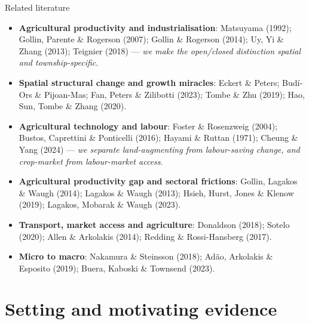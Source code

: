 \documentclass[10pt,aspectratio=169]{beamer}
\begin{document}
\begin{frame}{Related literature}
  \footnotesize
  \begin{itemize}
    \item \textbf{Agricultural productivity and industrialisation}: Matsuyama (1992);
          Gollin, Parente \& Rogerson (2007); Gollin \& Rogerson (2014); Uy, Yi \& Zhang
          (2013); Teignier (2018) --- \emph{we make the open/closed distinction spatial and
          township-specific}.
    \item \textbf{Spatial structural change and growth miracles}: Eckert \& Peters;
          Budí-Ors \& Pijoan-Mas; Fan, Peters \& Zilibotti (2023); Tombe \& Zhu (2019);
          Hao, Sun, Tombe \& Zhang (2020).
    \item \textbf{Agricultural technology and labour}: Foster \& Rosenzweig (2004); Bustos,
          Caprettini \& Ponticelli (2016); Hayami \& Ruttan (1971); Cheung \& Yang (2024)
          --- \emph{we separate land-augmenting from labour-saving change, and crop-market
          from labour-market access}.
    \item \textbf{Agricultural productivity gap and sectoral frictions}: Gollin, Lagakos
          \& Waugh (2014); Lagakos \& Waugh (2013); Hsieh, Hurst, Jones \& Klenow (2019);
          Lagakos, Mobarak \& Waugh (2023).
    \item \textbf{Transport, market access and agriculture}: Donaldson (2018); Sotelo (2020); Allen \& Arkolakis
          (2014); Redding \& Rossi-Hansberg (2017).
    \item \textbf{Micro to macro}: Nakamura \& Steinsson (2018); Adão, Arkolakis \&
          Esposito (2019); Buera, Kaboski \& Townsend (2023).
  \end{itemize}
\end{frame}

\section{Setting and motivating evidence}
\end{document}
